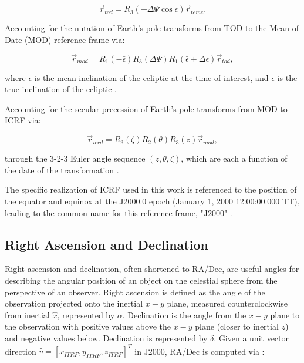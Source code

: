 \begin{equation} \label{eq:teme_to_tod}
  \vec{r}_{tod} = R_3(-\Delta \Psi \cos \epsilon) \vec{r}_{teme}.
\end{equation}

Accounting for the nutation of Earth's pole transforms from TOD to the Mean of Date (MOD) reference frame via:

\begin{equation} \label{eq:tod_to_mod}
  \vec{r}_{mod} = R_1(-\bar{\epsilon}) R_3(\Delta\Psi) R_1(\bar{\epsilon} + \Delta\epsilon) \vec{r}_{tod},
\end{equation}

where $\bar{\epsilon}$ is the mean inclination of the ecliptic at the time of interest, and $\epsilon$ is the true inclination of the ecliptic \cite{vallado4ed}.

Accounting for the secular precession of Earth's pole transforms from MOD to ICRF via:

\begin{equation} \label{eq:mod_to_icrf}
  \vec{r}_{icrd} = R_3(\zeta) R_2(\theta) R_3(z) \vec{r}_{mod},
\end{equation}

through the 3-2-3 Euler angle sequence $\left( z, \theta, \zeta \right)$, which are each a function of the date of the transformation \cite{frueh2019notes}.

The specific realization of ICRF used in this work is referenced to the position of the equator and equinox at the J2000.0 epoch (January 1, 2000 12:00:00.000 TT), leading to the common name for this reference frame, "J2000" \cite{vallado4ed}.

\subsection{Right Ascension and Declination}

Right ascension and declination, often shortened to RA/Dec, are useful angles for describing the angular position of an object on the celestial sphere from the perspective of an observer. Right ascension is defined as the angle
of the observation projected onto the inertial $x-y$ plane, measured counterclockwise from inertial
$\hat{x}$, represented by $\alpha$. Declination is the angle from the $x-y$ plane to the observation
with positive values above the $x-y$ plane (closer to inertial $z$) and negative values below.
Declination is represented by $\delta$. Given a unit vector direction $\hat{v} = \left[ x_{ITRF}, y_{ITRF}, z_{ITRF} \right]^T$ in J2000, RA/Dec is computed via \cite{frueh2019notes}:

